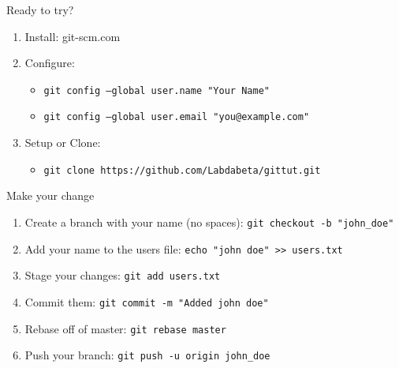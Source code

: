 \documentclass{beamer}
\begin{document}
\begin{frame}{Ready to try?}
    \begin{enumerate}
        \item<1->Install: git-scm.com

        \item<2->Configure:
            \begin{itemize}
                \item<2->\texttt{git config --global user.name "Your Name"}

                \item<3->\texttt{git config --global user.email "you@example.com"}
            \end{itemize}

        \item<3->Setup or Clone:
            \begin{itemize}
                \item<2->\texttt{git clone https://github.com/Labdabeta/gittut.git}
            \end{itemize}
    \end{enumerate}



\end{frame}

\begin{frame}{Make your change}
    \begin{enumerate}
        \item<1->Create a branch with your name (no spaces):
            \texttt{git checkout -b "john\_doe"}

        \item<2->Add your name to the users file:
            \texttt{echo "john doe" >> users.txt}

        \item<3->Stage your changes:
            \texttt{git add users.txt}

        \item<4->Commit them:
            \texttt{git commit -m "Added john doe"}

        \item<5->Rebase off of master:
            \texttt{git rebase master}

        \item<6->Push your branch:
            \texttt{git push -u origin john\_doe}
    \end{enumerate}

\end{frame}
\end{document}

